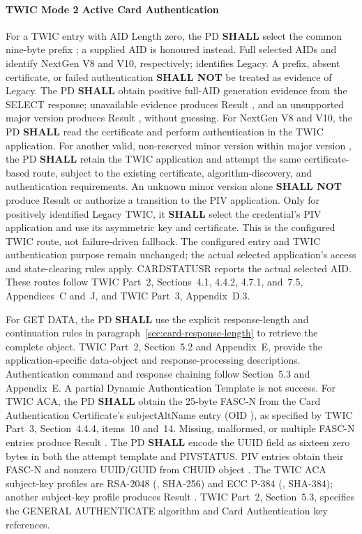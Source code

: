 \paragraph{TWIC Mode 2 Active Card Authentication}\label{sec:pivauto-twic}
For a TWIC entry with AID Length zero, the PD \textbf{SHALL} select the common nine-byte
prefix ; a supplied AID is honoured instead. Full selected AIDs
 and  identify NextGen V8
and V10, respectively;  identifies Legacy. A prefix, absent certificate, or failed authentication \textbf{SHALL NOT}
be treated as evidence of Legacy. The PD \textbf{SHALL} obtain positive full-AID generation
evidence from the SELECT response; unavailable evidence produces Result , and
an unsupported major version produces Result , without guessing.
For NextGen V8 and V10, the PD \textbf{SHALL} read the certificate and perform
 authentication in the TWIC application. For another valid, non-reserved
minor version within major version , the PD \textbf{SHALL} retain the TWIC
application and attempt the same certificate-based route, subject to the existing
certificate, algorithm-discovery, and authentication requirements. An unknown minor
version alone \textbf{SHALL NOT} produce Result  or authorize a transition
to the PIV application. Only for positively identified Legacy TWIC, it \textbf{SHALL}
select the credential's PIV application and use its asymmetric  key and
 certificate. This is the configured TWIC route, not failure-driven fallback.
The configured entry and TWIC authentication purpose remain unchanged; the actual selected
application's access and state-clearing rules apply. CARDSTATUSR reports the actual selected
AID. These routes follow TWIC Part~2, Sections~4.1, 4.4.2, 4.7.1, and~7.5,
Appendices~C and~J, and TWIC Part~3, Appendix~D.3.

For GET DATA, the PD \textbf{SHALL} use the explicit response-length and
continuation rules in paragraph~\ref{sec:card-response-length} to retrieve the
complete object. TWIC Part~2, Section~5.2 and Appendix~E, provide the
application-specific data-object and response-processing descriptions. Authentication command and response chaining follow
Section~5.3 and Appendix~E. A partial Dynamic Authentication Template is not success.
For TWIC ACA, the PD \textbf{SHALL} obtain the 25-byte FASC-N from the Card
Authentication Certificate's subjectAltName  entry
(OID ), as specified by TWIC Part~3,
Section~4.4.4, items~10 and~14. Missing, malformed, or multiple FASC-N entries
produce Result . The PD \textbf{SHALL} encode the UUID field as sixteen
zero bytes in both the attempt template and PIVSTATUS. PIV entries obtain their
FASC-N and nonzero UUID/GUID from CHUID object .
The TWIC ACA subject-key profiles are RSA-2048 (, SHA-256) and
ECC P-384 (, SHA-384); another subject-key profile produces
Result . TWIC Part~2, Section~5.3, specifies the GENERAL AUTHENTICATE
algorithm and Card Authentication key references.

